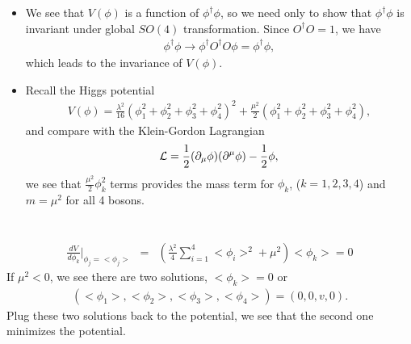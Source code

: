 \documentclass[11pt]{article}
\def\del{{\partial}}
\begin{document}
\section{ }
\begin{itemize}
    \item We see that $V(\phi)$ is a function of $\phi^\dagger \phi$, so we need only to show that $\phi^\dagger \phi$ is invariant under global
    $SO(4)$ transformation. Since $O^\dagger O=1$, we have
    \begin{eqnarray}
        \phi^\dagger \phi \to \phi^\dagger O^\dagger O \phi = \phi^\dagger \phi,
    \end{eqnarray}
    which leads to the invariance of $V(\phi)$.
    \item Recall the Higgs potential
    \begin{eqnarray}
        V(\phi)=\frac{\lambda^2}{16}(\phi_1^2+\phi_2^2+\phi_3^2+\phi_4^2)^2+\frac{\mu^2}{2}(\phi_1^2+\phi_2^2+\phi_3^2+\phi_4^2),
    \end{eqnarray} 
    and compare with the Klein-Gordon Lagrangian
    \begin{eqnarray}
        {\cal L}= \frac{1}{2} (\del_\mu \phi)(\del^\mu \phi) - \frac{1}{2}\phi,
    \end{eqnarray}
    we see that $\frac{\mu^2}{2} \phi^2_k$ terms provides the mass term for $\phi_k$, ($k=1,2,3,4$) and $m=\mu^2$ for all 4 bosons. 
\end{itemize}

\section{ }
\begin{eqnarray}
    \frac{dV}{d\phi_k}|_{\phi_j=<\phi_j>}&=&
    (\frac{\lambda^2}{4}\sum_{i=1}^4 <\phi_i>^2+\mu^2) <\phi_k>=0 
  \end{eqnarray}
If $\mu^2<0$, we see there are two solutions, $<\phi_k>=0$ or
\begin{eqnarray}
    (<\phi_1>,<\phi_2>,<\phi_3>,<\phi_4>) = (0,0,v,0).
\end{eqnarray}
Plug these two solutions back to the potential, we see that the second one minimizes the potential.
\end{document}
